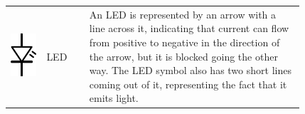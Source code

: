 \begin{center}
\begin{tabular}{M{0.1\linewidth} | M{0.12\linewidth} | m{0.6\linewidth}}
\includegraphics[scale=0.125]{LEDSymbol.png} & LED & An LED is represented by an arrow with a line across it, indicating that current can flow from positive to negative in the direction of the arrow, but it is blocked going the other way.  The LED symbol also has two short lines coming out of it, representing the fact that it emits light. \\
\end{tabular}
\end{center}

